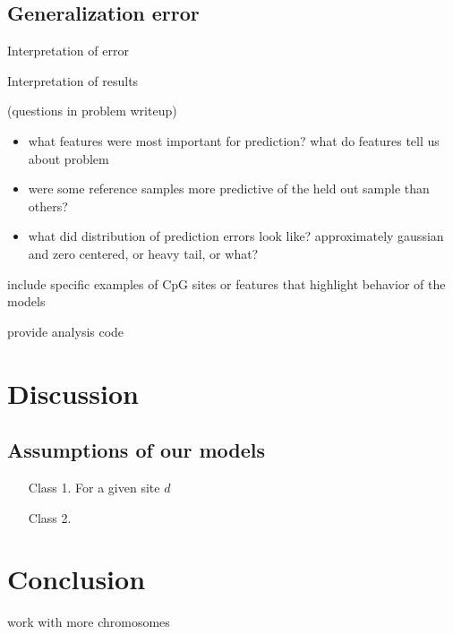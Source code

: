 \documentclass{article} %
\begin{document}
\subsection{Generalization error}


Interpretation of error

Interpretation of results


(questions in problem writeup)
\begin{itemize}
\item what features were most important for prediction? what do features tell us about problem
\item were some reference samples more predictive of the held out sample than others?
\item what did distribution of prediction errors look like? approximately gaussian and zero centered, or heavy tail, or what?
\end{itemize}


include specific examples of CpG sites or features that highlight behavior of the models

provide analysis code


\section{Discussion}

\subsection{Assumptions of our models}
\begin{enumerate}
\item [Class 1.] For a given site $d$ 
\item [Class 2.]
\end{enumerate}

\section{Conclusion}
work with more chromosomes



\end{document}
